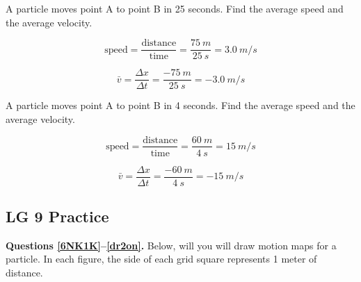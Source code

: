 \documentclass[]{exam}
\begin{document}
\begin{questions}
\question 
A particle moves point A to point B in 25 seconds. Find the average speed and the average velocity.


\begin{solution}
\begin{equation*}
    \text{speed} = \frac{\text{distance}}{\text{time}} = \frac{\SI{75}{m}}{\SI{25}{s}} = \boxed{\SI{3.0}{m/s}}
\end{equation*}

\begin{equation*}
    \bar{v} = \frac{\Delta x}{\Delta t} = \frac{\SI{-75}{m}}{\SI{25}{s}} = \boxed{\SI{-3.0}{m/s}}
\end{equation*}
\end{solution}

\question 
A particle moves point A to point B in 4 seconds. Find the average speed and the average velocity.


\begin{solution}
\begin{equation*}
    \text{speed} = \frac{\text{distance}}{\text{time}} = \frac{\SI{60}{m}}{\SI{4}{s}} = \boxed{\SI{15}{m/s}}
\end{equation*}

\begin{equation*}
    \bar{v} = \frac{\Delta x}{\Delta t} = \frac{\SI{-60}{m}}{\SI{4}{s}} = \boxed{\SI{-15}{m/s}}
\end{equation*}
\end{solution}


\end{questions}

\clearpage

\subsection*{LG 9 Practice}

\textbf{Questions \ref{6NK1K}--\ref{dr2on}.} Below, will you will draw motion maps for a particle. In each figure, the side of each grid square represents 1 meter of distance.
\end{document}
